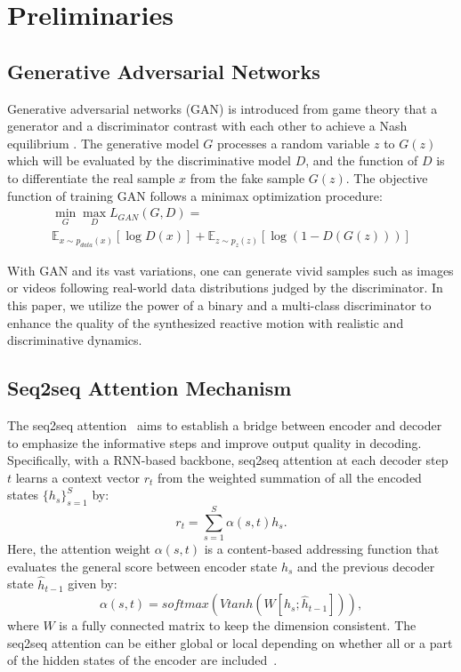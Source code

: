 \documentclass[times,twocolumn,final]{elsarticle}
\begin{document}
\section{Preliminaries}
\label{sec:preliminaries}
\subsection{Generative Adversarial Networks}
\label{sec:2.1}
Generative adversarial networks (GAN) \cite{goodfellow2014generative} is introduced from game theory that a generator and a discriminator contrast with each other to achieve a Nash equilibrium \cite{salimans2016improved}. The generative model $G$ processes a random variable $z$ to $G(z)$ which will be evaluated by the discriminative model $D$, and the function of $D$ is to differentiate the real sample $x$ from the fake sample $G(z)$. The objective function of training GAN follows a minimax optimization procedure:
\begin{multline}
\min\limits_{G}\max\limits_{D}L_{GAN} (G,D)=\\
\mathbb{E}_{x\sim p_{data}(x)}[\log D(x)]+\mathbb{E}_{z\sim p_{z}(z)}[\log (1-D(G(z)))]
\end{multline}

With GAN and its vast variations, one can generate vivid samples such as images \cite{liu2016coupled} or videos \cite{xu2019prediction} following real-world data distributions judged by the discriminator. In this paper, we utilize the power of a binary and a multi-class discriminator to enhance the quality of the synthesized reactive motion with realistic and discriminative dynamics.

\subsection{Seq2seq Attention Mechanism}
\label{sec:2.2}
The seq2seq attention~\cite{bahdanau2014neural} aims to establish a bridge between encoder and decoder to emphasize the informative steps and improve output quality in decoding. Specifically, with a RNN-based backbone, seq2seq attention at each decoder step $t$ learns a context vector $r_{t}$ from the weighted summation of all the encoded states $\{h_s\}_{s=1}^S$ by:
\begin{equation}
r_{t}=\sum_{s=1}^{S} \alpha(s,t)h_{s}.\label{eq:context}
\end{equation}
Here, the attention weight $\alpha(s,t)$ is a content-based addressing function that evaluates the general score between encoder state $h_{s}$ and the previous decoder state $\hat{h}_{t-1}$ given by:
\begin{equation}
\alpha(s,t)=softmax(Vtanh(W[h_{s};\hat{h}_{t-1}])),\label{eq:addressing}%
\end{equation}
where $W$ is a fully connected matrix to keep the dimension consistent. The seq2seq attention can be either global or local depending on whether all or a part of the hidden states of the encoder are included~\cite{luong2015effective}.
\end{document}
